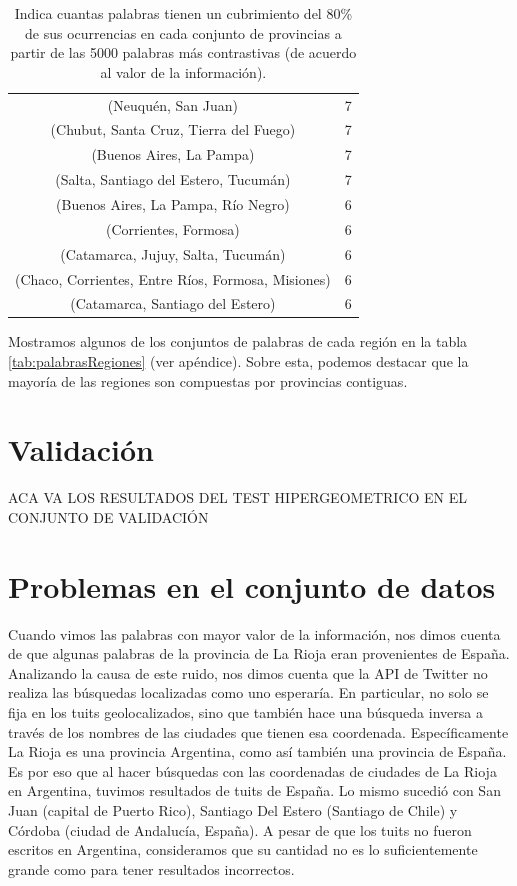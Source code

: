 \begin{table}[]
\begin{tabular}{|c|c|}
(Neuquén, San Juan)                                    & 7           \\ %
(Chubut, Santa Cruz, Tierra del Fuego)                 & 7           \\
(Buenos Aires, La Pampa)                                & 7           \\
(Salta, Santiago del Estero, Tucumán)                  & 7           \\
(Buenos Aires, La Pampa, Río Negro)                     & 6           \\
(Corrientes, Formosa)                                  & 6           \\
(Catamarca, Jujuy, Salta, Tucumán)                     & 6           \\
(Chaco, Corrientes, Entre Ríos, Formosa, Misiones)     & 6           \\
(Catamarca, Santiago del Estero)                       & 6           \\
\hline
\end{tabular}
\caption{Indica cuantas palabras tienen un cubrimiento del 80\% de sus ocurrencias en cada conjunto de provincias a partir de las 5000 palabras más contrastivas (de acuerdo al valor de la información).}
\label{tab:regiones}
\end{table}

Mostramos algunos de los conjuntos de palabras de cada región en la tabla \ref{tab:palabrasRegiones} (ver apéndice). Sobre esta, podemos destacar que la mayoría de las regiones son compuestas por provincias contiguas.


\section{Validación}
ACA VA LOS RESULTADOS DEL TEST HIPERGEOMETRICO EN EL CONJUNTO DE VALIDACIÓN

\section{Problemas en el conjunto de datos}
\label{problemas_datos}

Cuando vimos las palabras con mayor valor de la información, nos dimos cuenta de que algunas palabras de la provincia de La Rioja eran provenientes de España. Analizando la causa de este ruido, nos dimos cuenta que la API de Twitter no realiza las búsquedas localizadas como uno esperaría. En particular, no solo se fija en los tuits geolocalizados, sino que también hace una búsqueda inversa a través de los nombres de las ciudades que tienen esa coordenada. Específicamente La Rioja es una provincia Argentina, como así también una provincia de España. Es por eso que al hacer búsquedas con las coordenadas de ciudades de La Rioja en Argentina, tuvimos resultados de tuits de España. Lo mismo sucedió con San Juan (capital de Puerto Rico), Santiago Del Estero (Santiago de Chile) y Córdoba (ciudad de Andalucía, España). A pesar de que los tuits no fueron escritos en Argentina, consideramos que su cantidad no es lo suficientemente grande como para tener resultados incorrectos.

